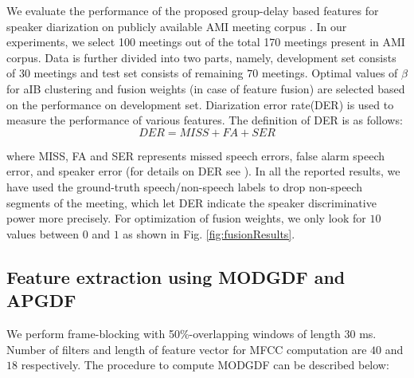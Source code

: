 \documentclass[conference]{IEEEtran}
\begin{document}
We evaluate the performance of the proposed group-delay based features for
speaker diarization on publicly available AMI meeting corpus \cite{AMIData}. In
our experiments, we select 100 meetings out of the total 170 meetings present in
AMI corpus. Data is further divided into two parts, namely, development set
consists of $30$ meetings and test set consists of remaining $70$ meetings.
Optimal values of $\beta$ for aIB clustering and fusion weights (in case of
feature fusion) are selected based on the performance on development set.
Diarization error rate(DER) is used to measure the performance of various
features. The definition of DER is as follows: 
\begin{equation}
DER = MISS + FA + SER
\end{equation}

where MISS, FA and SER represents  missed speech errors, false alarm speech
error, and speaker error (for details on DER see \cite{NIST}). In all the
reported results, we have used the ground-truth speech/non-speech labels to drop
non-speech segments of the meeting, which let DER indicate the speaker
discriminative power more precisely. For optimization of fusion weights, we only
look for $10$ values between $0$ and $1$ as shown in Fig.
\ref{fig:fusionResults}.

\subsection{Feature extraction using MODGDF and APGDF}

We perform frame-blocking with 50\%-overlapping windows of length 30 ms. Number
of filters and length of feature vector for MFCC computation are $40$ and $18$
respectively. The procedure to compute MODGDF can be described below:
\end{document}
